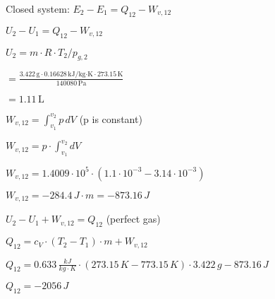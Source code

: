 Closed system:  
\( E_2 - E_1 = Q_{12} - W_{v,12} \)  

\( U_2 - U_1 = Q_{12} - W_{v,12} \)  

\( U_2 = m \cdot R \cdot T_2 / p_{g,2} \)  

\( = \frac{3.422 \, \text{g} \cdot 0.16628 \, \text{kJ/kg·K} \cdot 273.15 \, \text{K}}{140080 \, \text{Pa}} \)  

\( = 1.11 \, \text{L} \)

\( W_{v,12} = \int_{v_1}^{v_2} p \, dV \)  
(p is constant)  

\( W_{v,12} = p \cdot \int_{v_1}^{v_2} dV \)  

\( W_{v,12} = 1.4009 \cdot 10^5 \cdot (1.1 \cdot 10^{-3} - 3.14 \cdot 10^{-3}) \)  

\( W_{v,12} = -284.4 \, J \cdot m = -873.16 \, J \)  

\( U_2 - U_1 + W_{v,12} = Q_{12} \)  
(perfect gas)  

\( Q_{12} = c_V \cdot (T_2 - T_1) \cdot m + W_{v,12} \)  

\( Q_{12} = 0.633 \, \frac{kJ}{kg \cdot K} \cdot (273.15 \, K - 773.15 \, K) \cdot 3.422 \, g - 873.16 \, J \)  

\( Q_{12} = -2056 \, J \)